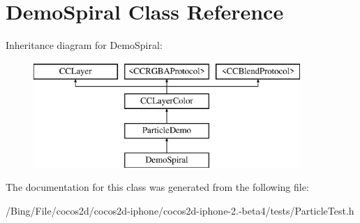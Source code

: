 \hypertarget{interface_demo_spiral}{\section{Demo\-Spiral Class Reference}
\label{interface_demo_spiral}
}
Inheritance diagram for Demo\-Spiral\-:\begin{figure}[H]
\begin{center}
\leavevmode
\includegraphics[height=4.000000cm]{interface_demo_spiral}
\end{center}
\end{figure}


The documentation for this class was generated from the following file\-:\begin{DoxyCompactItemize}
\item 
/\-Bing/\-File/cocos2d/cocos2d-\/iphone/cocos2d-\/iphone-\/2.-\/beta4/tests/Particle\-Test.\-h\end{DoxyCompactItemize}
